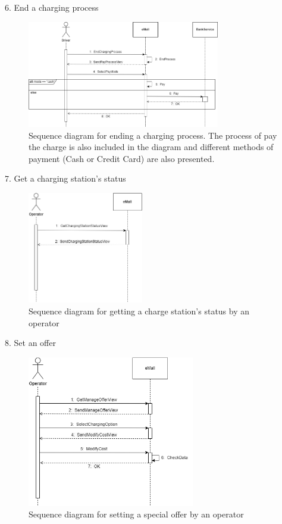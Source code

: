 \documentclass[../main.tex]{subfiles}
\begin{document}
6. End a charging process
\begin{figure}[H]
    \centering
    \includegraphics[width=0.75\textwidth]{sequences/sd_endCharge.png}
    \caption{Sequence diagram for ending a charging process. The process of pay the charge is also included in the diagram and different methods of payment (Cash or Credit Card) are also presented.}
    \label{fig:endCharge}
\end{figure}

7. Get a charging station’s status
\begin{figure}[H]
    \centering
    \includegraphics[width=0.45\textwidth]{sequences/sd_getStatus.png}
    \caption{Sequence diagram for getting a charge station’s status by an operator}
    \label{fig:getStatus}
\end{figure}

8. Set an offer
\begin{figure}[H]
    \centering
    \includegraphics[width=0.65\textwidth]{sequences/sd_offer.png}
    \caption{Sequence diagram for setting a special offer by an operator}
    \label{fig:offer}
\end{figure}
\end{document}
